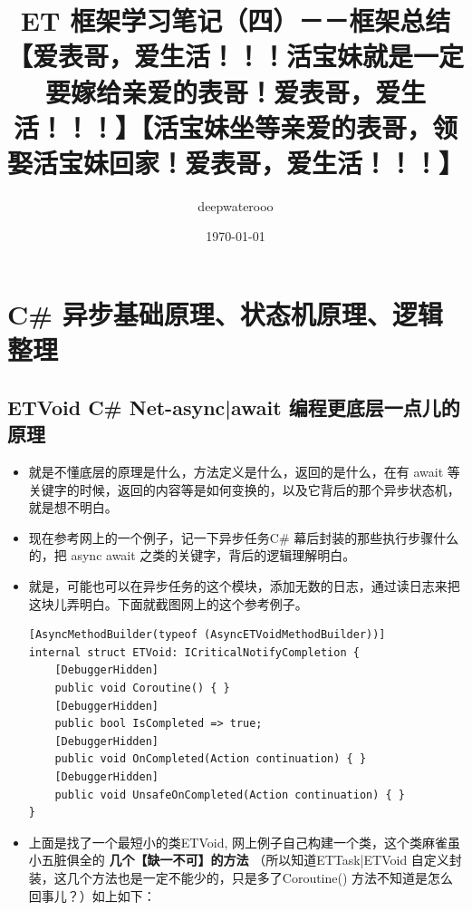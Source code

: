 \documentclass[9pt, b5paper]{article}
\author{deepwaterooo}
\date{\today}
\title{ET 框架学习笔记（四）－－框架总结【爱表哥，爱生活！！！活宝妹就是一定要嫁给亲爱的表哥！爱表哥，爱生活！！！】【活宝妹坐等亲爱的表哥，领娶活宝妹回家！爱表哥，爱生活！！！】}
\begin{document}
\maketitle
\tableofcontents


\section{C\# 异步基础原理、状态机原理、逻辑整理}
\label{sec:org68dedf5}
\subsection{ETVoid C\# Net-async|await 编程更底层一点儿的原理}
\label{sec:org0047e6c}
\begin{itemize}
\item 就是不懂底层的原理是什么，方法定义是什么，返回的是什么，在有 await 等关键字的时候，返回的内容等是如何变换的，以及它背后的那个异步状态机，就是想不明白。
\item 现在参考网上的一个例子，记一下异步任务C\# 幕后封装的那些执行步骤什么的，把 async await 之类的关键字，背后的逻辑理解明白。
\item 就是，可能也可以在异步任务的这个模块，添加无数的日志，通过读日志来把这块儿弄明白。下面就截图网上的这个参考例子。
\begin{verbatim}
[AsyncMethodBuilder(typeof (AsyncETVoidMethodBuilder))]
internal struct ETVoid: ICriticalNotifyCompletion {
    [DebuggerHidden]
    public void Coroutine() { }
    [DebuggerHidden]
    public bool IsCompleted => true;
    [DebuggerHidden]
    public void OnCompleted(Action continuation) { }
    [DebuggerHidden]
    public void UnsafeOnCompleted(Action continuation) { }
}
\end{verbatim}
\item 上面是找了一个最短小的类ETVoid, 网上例子自己构建一个类，这个类麻雀虽小五脏俱全的 \textbf{几个【缺一不可】的方法} （所以知道ETTask|ETVoid 自定义封装，这几个方法也是一定不能少的，只是多了Coroutine() 方法不知道是怎么回事儿？）如上如下：
\end{itemize}
\end{document}
